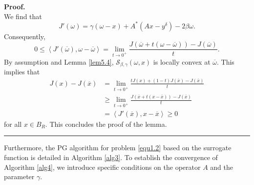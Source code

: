 \documentclass[a4paper,12pt]{article}
\numberwithin{equation}{section}
\newenvironment{proof}[1][Proof]{\textbf{#1.} }
{\ \rule{0.75em}{0.75em}\smallskip}
\begin{document}
\begin{proof}
\begin{equation*}
    \end{equation*}
    We find that
    \begin{equation*}
        J'\left(\omega\right)=\gamma \left(\omega-x\right)+A^{*}\left(Ax-y^{\delta}\right)-2\beta\omega.
    \end{equation*}
    Consequently,
    \begin{equation*}
        0\leq\left<J'\left(\overline{\omega}\right),\omega-\overline{\omega}\right> =\lim_{t\rightarrow 0^{+}} \frac{J\left(\overline{\omega}+ t\left(\omega-\overline{\omega}\right)\right) -J\left(\overline{\omega}\right)}{t}.
    \end{equation*}
    By assumption and Lemma \ref{lem5.4}, $\mathcal{S}_{\beta,\gamma}(\omega,x)$ is locally convex at $\overline{\omega}$. This implies that
    \begin{align*}
        J\left(x\right)-J\left(\overline{x}\right)
        & =\lim_{t\rightarrow 0^{+}} \frac{tJ\left(x\right)+\left(1-t\right) J\left(\overline{x}\right)-J\left(\overline{x}\right)}{t} \\
        & \geq \lim_{t\rightarrow 0^{+}} \frac{J\left(\overline{x}+ t\left(x-\overline{x}\right)\right) -J\left(\overline{x}\right)}{t} \\
        & =\left<J'\left(\overline{x}\right),x-\overline{x}\right>\geq 0
    \end{align*}
    for all $x\in B_{R}$. This concludes the proof of the lemma.
\end{proof}

Furthermore, the PG algorithm for problem \eqref{equ1.2} based on the surrogate function is detailed in Algorithm \ref{alg3}. To establish the convergence of Algorithm \ref{alg4}, we introduce specific conditions on the operator $A$ and the parameter $\gamma$.

\begin{algorithm}
\caption{PG-$\left(\ell_{1}^{2}-\eta\ell_{2}^{2}\right)$ algorithm based on SF for problem \eqref{equ1.4}}
\begin{algorithmic}\label{alg3}
\end{algorithmic}
\end{algorithm}
\end{document}
